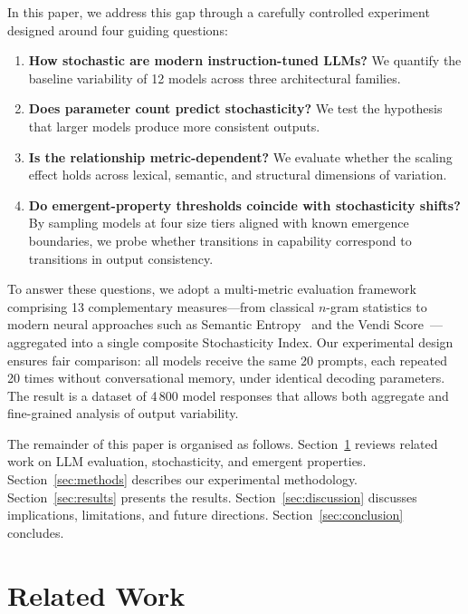 \documentclass[11pt,a4paper]{article}
\begin{document}
In this paper, we address this gap through a carefully controlled experiment designed around four guiding questions:

\begin{enumerate}[leftmargin=2em]
    \item \textbf{How stochastic are modern instruction-tuned LLMs?} We quantify the baseline variability of 12 models across three architectural families.
    \item \textbf{Does parameter count predict stochasticity?} We test the hypothesis that larger models produce more consistent outputs.
    \item \textbf{Is the relationship metric-dependent?} We evaluate whether the scaling effect holds across lexical, semantic, and structural dimensions of variation.
    \item \textbf{Do emergent-property thresholds coincide with stochasticity shifts?} By sampling models at four size tiers aligned with known emergence boundaries, we probe whether transitions in capability correspond to transitions in output consistency.
\end{enumerate}

To answer these questions, we adopt a multi-metric evaluation framework comprising 13 complementary measures---from classical $n$-gram statistics to modern neural approaches such as Semantic Entropy~\citep{kuhn2023semantic} and the Vendi Score~\citep{friedman2023vendi}---aggregated into a single composite Stochasticity Index.
Our experimental design ensures fair comparison: all models receive the same 20 prompts, each repeated 20 times without conversational memory, under identical decoding parameters.
The result is a dataset of 4\,800 model responses that allows both aggregate and fine-grained analysis of output variability.

The remainder of this paper is organised as follows.
Section~\ref{sec:related} reviews related work on LLM evaluation, stochasticity, and emergent properties.
Section~\ref{sec:methods} describes our experimental methodology.
Section~\ref{sec:results} presents the results.
Section~\ref{sec:discussion} discusses implications, limitations, and future directions.
Section~\ref{sec:conclusion} concludes.

\section{Related Work}
\label{sec:related}
\end{document}
